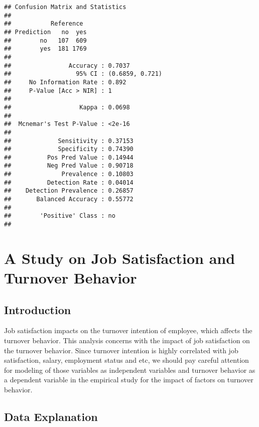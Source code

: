 \documentclass[
]{book}
\begin{document}
\begin{verbatim}
## Confusion Matrix and Statistics
## 
##           Reference
## Prediction   no  yes
##        no   107  609
##        yes  181 1769
##                                          
##                Accuracy : 0.7037         
##                  95% CI : (0.6859, 0.721)
##     No Information Rate : 0.892          
##     P-Value [Acc > NIR] : 1              
##                                          
##                   Kappa : 0.0698         
##                                          
##  Mcnemar's Test P-Value : <2e-16         
##                                          
##             Sensitivity : 0.37153        
##             Specificity : 0.74390        
##          Pos Pred Value : 0.14944        
##          Neg Pred Value : 0.90718        
##              Prevalence : 0.10803        
##          Detection Rate : 0.04014        
##    Detection Prevalence : 0.26857        
##       Balanced Accuracy : 0.55772        
##                                          
##        'Positive' Class : no             
## 
\end{verbatim}

\hypertarget{a-study-on-job-satisfaction-and-turnover-behavior}{%
\chapter{A Study on Job Satisfaction and Turnover Behavior}\label{a-study-on-job-satisfaction-and-turnover-behavior}}

\hypertarget{introduction-1}{%
\section{Introduction}\label{introduction-1}}

Job satisfaction impacts on the turnover intention of employee, which affects the
turnover behavior. This analysis concerns with the impact of job satisfaction
on the turnover behavior. Since turnover intention is highly correlated with job
satisfaction, salary, employment status and etc, we should pay careful attention
for modeling of those variables as independent variables and turnover behavior
as a dependent variable in the empirical study for the impact of factors on
turnover behavior.

\hypertarget{data-explanation-1}{%
\section{Data Explanation}\label{data-explanation-1}}
\end{document}
